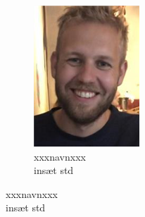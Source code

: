 \begin{titlepage}
\begin{figure}[b!]
\begin{subfigure}[1]{0.20\linewidth}
    \includegraphics[width=\linewidth]{Pictures/Frontpage/Nikolaj.png}
    \captionsetup{justification=centering}
    \caption[]{{\small xxxnavnxxx}\\{insæt std}}
    \end{subfigure}
    \hspace{2em}
    \vspace{20mm}
\end{figure}
\end{titlepage}